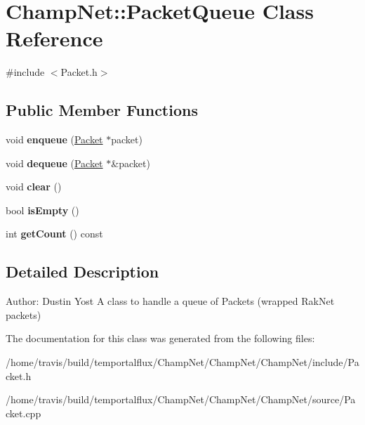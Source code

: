 \hypertarget{class_champ_net_1_1_packet_queue}{\section{Champ\-Net\-:\-:Packet\-Queue Class Reference}
\label{class_champ_net_1_1_packet_queue}
}


{\ttfamily \#include $<$Packet.\-h$>$}

\subsection*{Public Member Functions}
\begin{DoxyCompactItemize}
\item 
\hypertarget{class_champ_net_1_1_packet_queue_ad78fb4bda594d1941de0d0b97cb17c8f}{void {\bfseries enqueue} (\hyperlink{class_champ_net_1_1_packet}{Packet} $\ast$packet)}\label{class_champ_net_1_1_packet_queue_ad78fb4bda594d1941de0d0b97cb17c8f}

\item 
\hypertarget{class_champ_net_1_1_packet_queue_a775c0b091e646b35b24abd60ed8003e9}{void {\bfseries dequeue} (\hyperlink{class_champ_net_1_1_packet}{Packet} $\ast$\&packet)}\label{class_champ_net_1_1_packet_queue_a775c0b091e646b35b24abd60ed8003e9}

\item 
\hypertarget{class_champ_net_1_1_packet_queue_a58fb470b0b4a6678495c36e89a7d4f58}{void {\bfseries clear} ()}\label{class_champ_net_1_1_packet_queue_a58fb470b0b4a6678495c36e89a7d4f58}

\item 
\hypertarget{class_champ_net_1_1_packet_queue_a0959c0f0b04096739dbc64ffb3ce5a00}{bool {\bfseries is\-Empty} ()}\label{class_champ_net_1_1_packet_queue_a0959c0f0b04096739dbc64ffb3ce5a00}

\item 
\hypertarget{class_champ_net_1_1_packet_queue_af160b4a4fe3291c9d4bcb64952b4decb}{int {\bfseries get\-Count} () const }\label{class_champ_net_1_1_packet_queue_af160b4a4fe3291c9d4bcb64952b4decb}

\end{DoxyCompactItemize}


\subsection{Detailed Description}
Author\-: Dustin Yost A class to handle a queue of Packets (wrapped Rak\-Net packets) 

The documentation for this class was generated from the following files\-:\begin{DoxyCompactItemize}
\item 
/home/travis/build/temportalflux/\-Champ\-Net/\-Champ\-Net/\-Champ\-Net/include/Packet.\-h\item 
/home/travis/build/temportalflux/\-Champ\-Net/\-Champ\-Net/\-Champ\-Net/source/Packet.\-cpp\end{DoxyCompactItemize}
